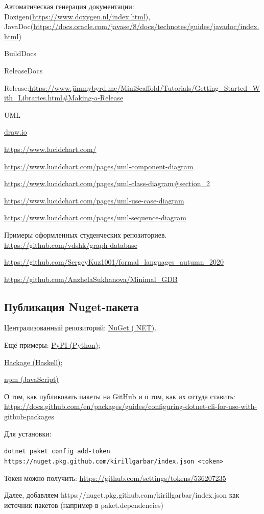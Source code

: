 Автоматическая генерация документации: Doxigen(\url{https://www.doxygen.nl/index.html}),
JavaDoc(\url{https://docs.oracle.com/javase/8/docs/technotes/guides/javadoc/index.html})

BuildDocs

ReleaseDocs

Release:\url{https://www.jimmybyrd.me/MiniScaffold/Tutorials/Getting_Started_With_Libraries.html#Making-a-Release}

UML

\url{draw.io}

\url{https://www.lucidchart.com/}

\url{https://www.lucidchart.com/pages/uml-component-diagram}

\url{https://www.lucidchart.com/pages/uml-class-diagram#section_2}

\url{https://www.lucidchart.com/pages/uml-use-case-diagram}

\url{https://www.lucidchart.com/pages/uml-sequence-diagram}


Примеры оформленных студенческих репозиториев.
\url{https://github.com/vdshk/graph-database}

\url{https://github.com/SergeyKuz1001/formal_languages_autumn_2020}

\url{https://github.com/AnzhelaSukhanova/Minimal_GDB}


\subsection{Публикация Nuget-пакета}

Централизованный репозиторий: \href{https://www.nuget.org/}{NuGet (.NET)}.

Ещё примеры: \href{https://pypi.org/}{PyPI (Python)}; 

\href{https://hackage.haskell.org/}{Hackage (Haskell)}; 

\href{https://www.npmjs.com/}{npm (JavaScript)}


О том, как публиковать пакеты на GitHub и о том, как их оттуда ставить: \url{https://docs.github.com/en/packages/guides/configuring-dotnet-cli-for-use-with-github-packages}

Для установки:

\verb|dotnet paket config add-token https://nuget.pkg.github.com/kirillgarbar/index.json <token>|

Токен можно получить: \url{https://github.com/settings/tokens/536207235}

Далее, добавляем https://nuget.pkg.github.com/kirillgarbar/index.json как источник пакетов (например в paket.dependencies)